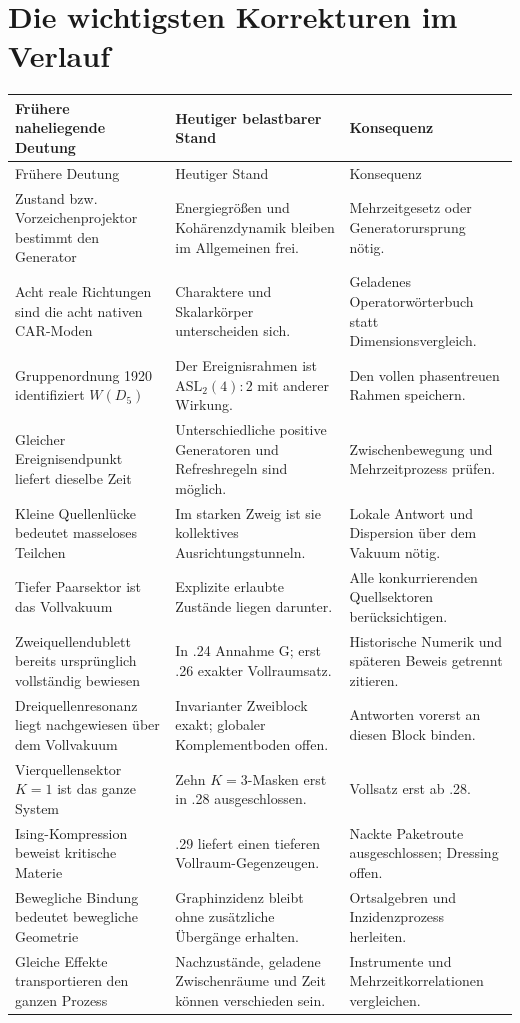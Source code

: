 \documentclass[11pt,a4paper,oneside,parskip=half,headings=normal,numbers=noenddot,bibliography=totoc]{scrreprt}
\begin{document}
\section{Die wichtigsten Korrekturen im Verlauf}
\begin{longtable}{@{}P{.25\textwidth}P{.42\textwidth}P{.25\textwidth}@{}}
\toprule
Frühere naheliegende Deutung & Heutiger belastbarer Stand & Konsequenz\\\midrule
\endfirsthead
\toprule Frühere Deutung & Heutiger Stand & Konsequenz\\\midrule
\endhead
Zustand bzw. Vorzeichenprojektor bestimmt den Generator & Energiegrößen und Kohärenzdynamik bleiben im Allgemeinen frei. & Mehrzeitgesetz oder Generatorursprung nötig.\\[4pt]
Acht reale Richtungen sind die acht nativen CAR-Moden & Charaktere und Skalarkörper unterscheiden sich. & Geladenes Operatorwörterbuch statt Dimensionsvergleich.\\[4pt]
Gruppenordnung 1920 identifiziert $W(D_5)$ & Der Ereignisrahmen ist $\mathrm{ASL}_2(4):2$ mit anderer Wirkung. & Den vollen phasentreuen Rahmen speichern.\\[4pt]
Gleicher Ereignisendpunkt liefert dieselbe Zeit & Unterschiedliche positive Generatoren und Refreshregeln sind möglich. & Zwischenbewegung und Mehrzeitprozess prüfen.\\[4pt]
Kleine Quellenlücke bedeutet masseloses Teilchen & Im starken Zweig ist sie kollektives Ausrichtungstunneln. & Lokale Antwort und Dispersion über dem Vakuum nötig.\\[4pt]
Tiefer Paarsektor ist das Vollvakuum & Explizite erlaubte Zustände liegen darunter. & Alle konkurrierenden Quellsektoren berücksichtigen.\\[4pt]
Zweiquellendublett bereits ursprünglich vollständig bewiesen & In .24 Annahme G; erst .26 exakter Vollraumsatz. & Historische Numerik und späteren Beweis getrennt zitieren.\\[4pt]
Dreiquellenresonanz liegt nachgewiesen über dem Vollvakuum & Invarianter Zweiblock exakt; globaler Komplementboden offen. & Antworten vorerst an diesen Block binden.\\[4pt]
Vierquellensektor $K=1$ ist das ganze System & Zehn $K=3$-Masken erst in .28 ausgeschlossen. & Vollsatz erst ab .28.\\[4pt]
Ising-Kompression beweist kritische Materie & .29 liefert einen tieferen Vollraum-Gegenzeugen. & Nackte Paketroute ausgeschlossen; Dressing offen.\\[4pt]
Bewegliche Bindung bedeutet bewegliche Geometrie & Graphinzidenz bleibt ohne zusätzliche Übergänge erhalten. & Ortsalgebren und Inzidenzprozess herleiten.\\[4pt]
Gleiche Effekte transportieren den ganzen Prozess & Nachzustände, geladene Zwischenräume und Zeit können verschieden sein. & Instrumente und Mehrzeitkorrelationen vergleichen.\\\bottomrule
\end{longtable}
\end{document}
